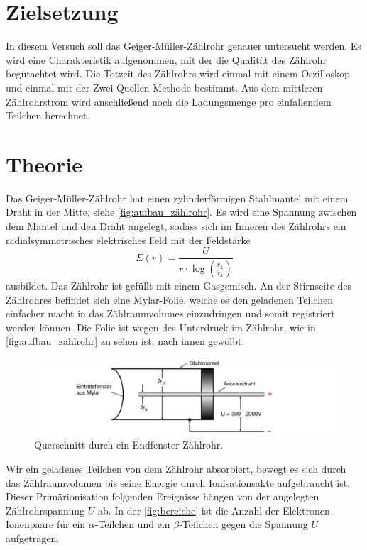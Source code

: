 \section{Zielsetzung}
\label{sec:Zielsetzung}
In diesem Versuch soll das Geiger-Müller-Zählrohr genauer untersucht werden. Es wird eine Charakteristik aufgenommen, mit der die Qualität des Zählrohr begutachtet wird.
Die Totzeit des Zählrohrs wird einmal mit einem Oszilloskop und einmal mit der Zwei-Quellen-Methode bestimmt. 
Aus dem mittleren Zählrohrstrom wird anschließend noch die Ladungsmenge pro einfallendem Teilchen berechnet.
\section{Theorie}
\label{sec:Theorie}
Das Geiger-Müller-Zählrohr hat einen zylinderförmigen Stahlmantel mit einem Draht in der Mitte, siehe \autoref{fig:aufbau_zählrohr}.
Es wird eine Spannung zwischen dem Mantel und den Draht angelegt, sodass sich im Inneren des Zählrohrs ein radialsymmetrisches elektrisches Feld mit der Feldstärke
\begin{equation*}
    E(r) = \frac{U}{r \cdot \log(\frac{r_{\text{k}}}{r_{\text{a}}})}
\end{equation*}
ausbildet.
Das Zählrohr ist gefüllt mit einem Gasgemisch.
An der Stirnseite des Zählrohres befindet sich eine Mylar-Folie, welche es den geladenen Teilchen einfacher macht in das Zählraumvolumes einzudringen und somit registriert werden können.
Die Folie ist wegen des Unterdruck im Zählrohr, wie in \autoref{fig:aufbau_zählrohr} zu sehen ist, nach innen gewölbt.
\begin{figure}
    \centering
    \includegraphics[width=\textwidth]{content/aufbau_zahlrohr.pdf}
    \caption{Querschnitt durch ein Endfenster-Zählrohr.\cite{anleitung}}
    \label{fig:aufbau_zählrohr}
\end{figure}
Wir ein geladenes Teilchen von dem Zählrohr absorbiert, bewegt es sich durch das Zählraumvolumen bis seine Energie durch Ionisationsakte aufgebraucht ist.
Dieser Primärionisation folgenden Ereignisse hängen von der angelegten Zählrohrspannung $U$ ab.
In der \autoref{fig:bereiche} ist die Anzahl der Elektronen-Ionenpaare für ein $\alpha$-Teilchen und ein $\beta$-Teilchen gegen die Spannung $U$ aufgetragen.

